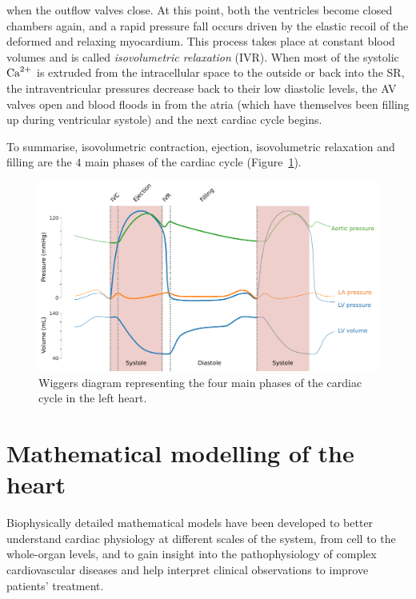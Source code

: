 when the outflow valves close. At this point, both the ventricles become closed chambers again, and a rapid pressure fall occurs driven by the elastic recoil of the deformed and relaxing myocardium. This process takes place at constant blood volumes and is called \textit{isovolumetric relaxation} (\acs{IVR}). When most of the systolic $\textrm{Ca}^{2+}$ is extruded from the intracellular space to the outside or back into the SR, the intraventricular pressures decrease back to their low diastolic levels, the AV valves open and blood floods in from the atria (which have themselves been filling up during ventricular systole) and the next cardiac cycle begins.

\vspace{0.2cm}
To summarise, isovolumetric contraction, ejection, isovolumetric relaxation and filling are the $4$ main phases of the cardiac cycle (Figure~\ref{fig:wiggersdiagram}).

\begin{figure}[!ht]
    \myfloatalign
    \includegraphics[width=\textwidth]{figures/chapter01/wiggers_diagram.pdf}
    \caption{Wiggers diagram representing the four main phases of the cardiac cycle in the left heart.}
    \label{fig:wiggersdiagram}
\end{figure}


%
%
%
\section{Mathematical modelling of the heart}\label{sec:ch1mathematical_modelling_of_the_heart}
Biophysically detailed mathematical models have been developed to better understand cardiac physiology at different scales of the system, from cell to the whole-organ levels, and to gain insight into the pathophysiology of complex cardiovascular diseases and help interpret clinical observations to improve patients' treatment.


